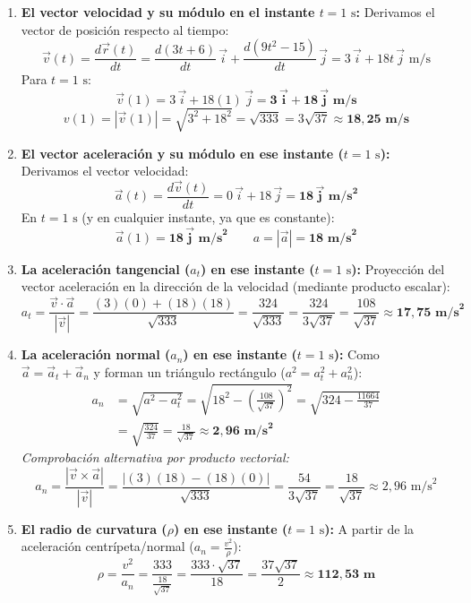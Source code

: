 ﻿\documentclass[11pt,a4paper]{article}
\begin{document}
\begin{enumerate}[label=\textbf{\alph*)}, leftmargin=2em, itemsep=8pt]
    \item \textbf{El vector velocidad y su módulo en el instante $t = 1\text{ s}$:}
    Derivamos el vector de posición respecto al tiempo:
    \[
    \vec{v}(t) = \frac{d\vec{r}(t)}{dt} = \frac{d(3t + 6)}{dt}\,\vec{i} + \frac{d(9t^2 - 15)}{dt}\,\vec{j} = 3\,\vec{i} + 18t\,\vec{j}\text{ m/s}
    \]
    Para $t = 1\text{ s}$:
    \[
    \vec{v}(1) = 3\,\vec{i} + 18(1)\,\vec{j} = \mathbf{3\,\vec{i} + 18\,\vec{j}\text{ m/s}}
    \]
    \[
    v(1) = |\vec{v}(1)| = \sqrt{3^2 + 18^2} = \sqrt{333} = 3\sqrt{37} \approx \mathbf{18{,}25\text{ m/s}}
    \]

    \item \textbf{El vector aceleración y su módulo en ese instante ($t = 1\text{ s}$):}
    Derivamos el vector velocidad:
    \[
    \vec{a}(t) = \frac{d\vec{v}(t)}{dt} = 0\,\vec{i} + 18\,\vec{j} = \mathbf{18\,\vec{j}\text{ m/s}^2}
    \]
    En $t = 1\text{ s}$ (y en cualquier instante, ya que es constante):
    \[
    \vec{a}(1) = \mathbf{18\,\vec{j}\text{ m/s}^2} \qquad a = |\vec{a}| = \mathbf{18\text{ m/s}^2}
    \]

    \item \textbf{La aceleración tangencial ($a_t$) en ese instante ($t = 1\text{ s}$):}
    Proyección del vector aceleración en la dirección de la velocidad (mediante producto escalar):
    \[
    a_t = \frac{\vec{v} \cdot \vec{a}}{|\vec{v}|} = \frac{(3)(0) + (18)(18)}{\sqrt{333}} = \frac{324}{\sqrt{333}} = \frac{324}{3\sqrt{37}} = \frac{108}{\sqrt{37}} \approx \mathbf{17{,}75\text{ m/s}^2}
    \]

    \item \textbf{La aceleración normal ($a_n$) en ese instante ($t = 1\text{ s}$):}
    Como $\vec{a} = \vec{a}_t + \vec{a}_n$ y forman un triángulo rectángulo ($a^2 = a_t^2 + a_n^2$):
    \begin{align*}
    a_n &= \sqrt{a^2 - a_t^2} = \sqrt{18^2 - \left(\frac{108}{\sqrt{37}}\right)^2} = \sqrt{324 - \frac{11664}{37}} \\
    &= \sqrt{\frac{324}{37}} = \frac{18}{\sqrt{37}} \approx \mathbf{2{,}96\text{ m/s}^2}
    \end{align*}
    \textit{Comprobación alternativa por producto vectorial:}
    \[
    a_n = \frac{|\vec{v} \times \vec{a}|}{|\vec{v}|} = \frac{|(3)(18) - (18)(0)|}{\sqrt{333}} = \frac{54}{3\sqrt{37}} = \frac{18}{\sqrt{37}} \approx 2{,}96\text{ m/s}^2
    \]

    \item \textbf{El radio de curvatura ($\rho$) en ese instante ($t = 1\text{ s}$):}
    A partir de la aceleración centrípeta/normal ($a_n = \frac{v^2}{\rho}$):
    \[
    \rho = \frac{v^2}{a_n} = \frac{333}{\frac{18}{\sqrt{37}}} = \frac{333 \cdot \sqrt{37}}{18} = \frac{37\sqrt{37}}{2} \approx \mathbf{112{,}53\text{ m}}
    \]
\end{enumerate}
\end{document}
